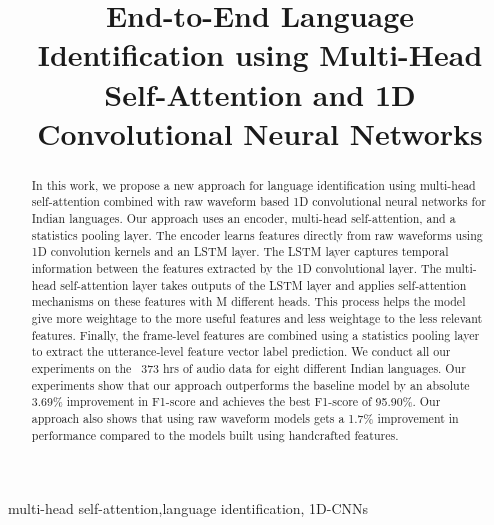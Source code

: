 \documentclass{article}
\title{End-to-End Language Identification using Multi-Head Self-Attention and 1D Convolutional Neural Networks}
\begin{document}
%
\maketitle
%
\begin{abstract}
In this work, we propose a new approach for language identification using multi-head self-attention combined with raw waveform based 1D convolutional neural networks for Indian languages. Our approach uses an encoder, multi-head self-attention, and a statistics pooling layer. The encoder learns features directly from raw waveforms using 1D convolution kernels and an LSTM layer. The LSTM layer captures temporal information between the features extracted by the 1D convolutional layer. The multi-head self-attention layer takes outputs of the LSTM layer and applies self-attention mechanisms on these features with M different heads. This process helps the model give more weightage to the more useful features and less weightage to the less relevant features. Finally, the frame-level features are combined using a statistics pooling layer to extract the utterance-level feature vector label prediction. We conduct all our experiments on the ~373 hrs of audio data for eight different Indian languages. Our experiments show that our approach outperforms the baseline model by an absolute 3.69\% improvement in F1-score and achieves the best F1-score of 95.90\%. Our approach also shows that using raw waveform models gets a 1.7\% improvement in performance compared to the models built using handcrafted features. 
\end{abstract}
%
\begin{keywords}
 multi-head self-attention,language identification, 1D-CNNs
\end{keywords}
%
\end{document}
